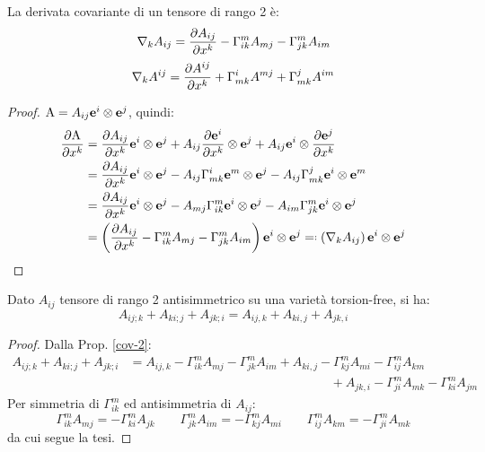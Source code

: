 \begin{proposition}\label{cov-2}
	La derivata covariante di un tensore di rango 2 è:
	\begin{equation}
		\nabla_k A_{ij} = \frac{\partial A_{ij}}{\partial x^k} - \Gamma^m_{ik} A_{mj} - \Gamma^m_{jk} A_{im}
		\label{eq:4.12}
	\end{equation}
	\begin{equation}
		\nabla_k A^{ij} = \frac{\partial A^{ij}}{\partial x^k} + \Gamma^i_{mk} A^{mj} + \Gamma^j_{mk} A^{im}
		\label{eq:4.13}
	\end{equation}
\end{proposition}
\begin{proof}
	$ \mathbf{\text{A}} = A_{ij} \mathbf{e}^i \otimes \mathbf{e}^j $, quindi:
	\begin{equation*}
		\begin{split}
			\frac{\pa \tens{A}}{\pa x^k}
			&= \frac{\pa A_{ij}}{\pa x^k} \ve{e}^i \otimes \ve{e}^j + A_{ij} \frac{\pa\ve{e}^i}{\pa x^k} \otimes \ve{e}^j + A_{ij} \ve{e}^i \otimes \frac{\pa\ve{e}^j}{\pa x^k}\\
			&= \frac{\pa A_{ij}}{\pa x^k} \ve{e}^i \otimes \ve{e}^j - A_{ij} \Gamma^i_{mk} \ve{e}^m \otimes \ve{e}^j - A_{ij} \Gamma^j_{mk} \ve{e}^i \otimes \ve{e}^m\\
			&= \frac{\pa A_{ij}}{\pa x^k} \ve{e}^i \otimes \ve{e}^j - A_{mj} \Gamma^m_{ik} \ve{e}^i \otimes \ve{e}^j - A_{im} \Gamma^m_{jk} \ve{e}^i \otimes \ve{e}^j\\
			&= \left( \frac{\pa A_{ij}}{\pa x^k} - \Gamma^m_{ik} A_{mj} - \Gamma^m_{jk} A_{im} \right) \ve{e}^i \otimes \ve{e}^j \eqdef \left( \nabla_k A_{ij} \right) \ve{e}^i \otimes \ve{e}^j
		\end{split}
	\end{equation*}
\end{proof}

\begin{proposition}
	Dato $ A_{ij} $ tensore di rango 2 antisimmetrico su una varietà torsion-free, si ha:
	\begin{equation}
		A_{ij;k} + A_{ki;j} + A_{jk;i} = A_{ij,k} + A_{ki,j} + A_{jk,i}
		\label{eq:4.14}
	\end{equation}
\end{proposition}
\begin{proof}
	Dalla Prop. \ref{cov-2}:
	\begin{equation*}
		\begin{split}
			A_{ij;k} + A_{ki;j} + A_{jk;i}
			&= A_{ij,k} - \Gamma^m_{ik} A_{mj} - \Gamma^m_{jk} A_{im} + A_{ki,j} - \Gamma^m_{kj} A_{mi} - \Gamma^m_{ij} A_{km} \\ &\qquad \qquad \qquad \qquad \qquad \qquad \qquad \qquad + A_{jk,i} - \Gamma^m_{ji} A_{mk} - \Gamma^m_{ki} A_{jm}
		\end{split}
	\end{equation*}
	Per simmetria di $ \Gamma^m_{ik} $ ed antisimmetria di $ A_{ij} $:
	\begin{equation*}
		\Gamma^m_{ik} A_{mj} = - \Gamma^m_{ki} A_{jk} \qquad \Gamma^m_{jk} A_{im} = - \Gamma^m_{kj} A_{mi} \qquad \Gamma^m_{ij} A_{km} = - \Gamma^m_{ji} A_{mk}
	\end{equation*}
	da cui segue la tesi.
\end{proof}

